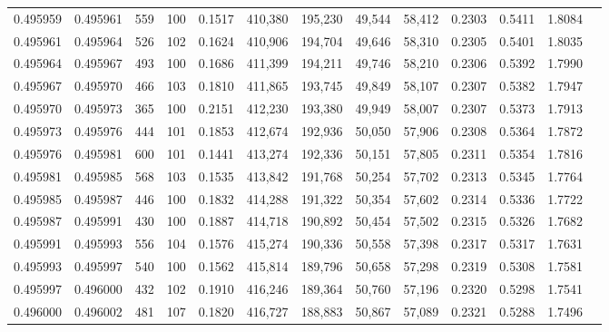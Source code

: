 \begin{tabular}{rrrrrrrrrrrrr}
0.495959 & 0.495961 &   559 & 100 &                                     0.1517 & 410,380 & 195,230 &  49,544 &  58,412 & 0.2303 & 0.5411 & 1.8084 \\
0.495961 & 0.495964 &   526 & 102 &                                     0.1624 & 410,906 & 194,704 &  49,646 &  58,310 & 0.2305 & 0.5401 & 1.8035 \\
0.495964 & 0.495967 &   493 & 100 &                                     0.1686 & 411,399 & 194,211 &  49,746 &  58,210 & 0.2306 & 0.5392 & 1.7990 \\
0.495967 & 0.495970 &   466 & 103 &                                     0.1810 & 411,865 & 193,745 &  49,849 &  58,107 & 0.2307 & 0.5382 & 1.7947 \\
0.495970 & 0.495973 &   365 & 100 &                                     0.2151 & 412,230 & 193,380 &  49,949 &  58,007 & 0.2307 & 0.5373 & 1.7913 \\
0.495973 & 0.495976 &   444 & 101 &                                     0.1853 & 412,674 & 192,936 &  50,050 &  57,906 & 0.2308 & 0.5364 & 1.7872 \\
0.495976 & 0.495981 &   600 & 101 &                                     0.1441 & 413,274 & 192,336 &  50,151 &  57,805 & 0.2311 & 0.5354 & 1.7816 \\
0.495981 & 0.495985 &   568 & 103 &                                     0.1535 & 413,842 & 191,768 &  50,254 &  57,702 & 0.2313 & 0.5345 & 1.7764 \\
0.495985 & 0.495987 &   446 & 100 &                                     0.1832 & 414,288 & 191,322 &  50,354 &  57,602 & 0.2314 & 0.5336 & 1.7722 \\
0.495987 & 0.495991 &   430 & 100 &                                     0.1887 & 414,718 & 190,892 &  50,454 &  57,502 & 0.2315 & 0.5326 & 1.7682 \\
0.495991 & 0.495993 &   556 & 104 &                                     0.1576 & 415,274 & 190,336 &  50,558 &  57,398 & 0.2317 & 0.5317 & 1.7631 \\
0.495993 & 0.495997 &   540 & 100 &                                     0.1562 & 415,814 & 189,796 &  50,658 &  57,298 & 0.2319 & 0.5308 & 1.7581 \\
0.495997 & 0.496000 &   432 & 102 &                                     0.1910 & 416,246 & 189,364 &  50,760 &  57,196 & 0.2320 & 0.5298 & 1.7541 \\
0.496000 & 0.496002 &   481 & 107 &                                     0.1820 & 416,727 & 188,883 &  50,867 &  57,089 & 0.2321 & 0.5288 & 1.7496 \\

\end{tabular}
